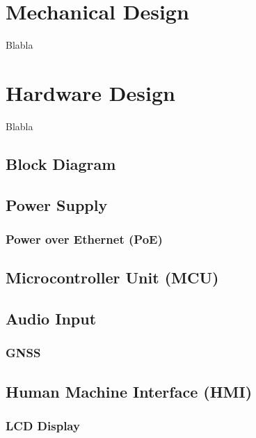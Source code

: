 \newpage
\section{Mechanical Design}
Blabla




\newpage
\section{Hardware Design}
Blabla

\subsection{Block Diagram}

\subsection{Power Supply}


\subsubsection{Power over Ethernet (PoE)}


\subsection{Microcontroller Unit (MCU)}


\subsection{Audio Input}

\subsubsection{GNSS}

\subsection{Human Machine Interface (HMI)}


\subsubsection{LCD Display}

